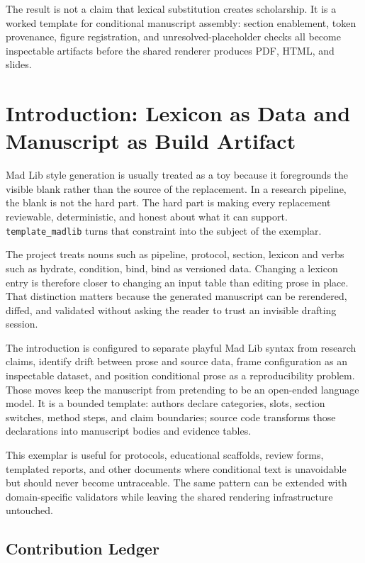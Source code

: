 \documentclass[
  english,
]{article}
\begin{document}
The result is not a claim that lexical substitution creates scholarship.
It is a worked template for conditional manuscript assembly: section
enablement, token provenance, figure registration, and
unresolved-placeholder checks all become inspectable artifacts before
the shared renderer produces PDF, HTML, and slides.

\newpage

\section{Introduction: Lexicon as Data and Manuscript as Build
Artifact}\label{introduction-lexicon-as-data-and-manuscript-as-build-artifact}

Mad Lib style generation is usually treated as a toy because it
foregrounds the visible blank rather than the source of the replacement.
In a research pipeline, the blank is not the hard part. The hard part is
making every replacement reviewable, deterministic, and honest about
what it can support. \texttt{template\_madlib} turns that constraint
into the subject of the exemplar.

The project treats nouns such as pipeline, protocol, section, lexicon
and verbs such as hydrate, condition, bind, bind as versioned data.
Changing a lexicon entry is therefore closer to changing an input table
than editing prose in place. That distinction matters because the
generated manuscript can be rerendered, diffed, and validated without
asking the reader to trust an invisible drafting session.

The introduction is configured to separate playful Mad Lib syntax from
research claims, identify drift between prose and source data, frame
configuration as an inspectable dataset, and position conditional prose
as a reproducibility problem. Those moves keep the manuscript from
pretending to be an open-ended language model. It is a bounded template:
authors declare categories, slots, section switches, method steps, and
claim boundaries; source code transforms those declarations into
manuscript bodies and evidence tables.

This exemplar is useful for protocols, educational scaffolds, review
forms, templated reports, and other documents where conditional text is
unavoidable but should never become untraceable. The same pattern can be
extended with domain-specific validators while leaving the shared
rendering infrastructure untouched.

\subsection{Contribution Ledger}\label{contribution-ledger}
\end{document}
